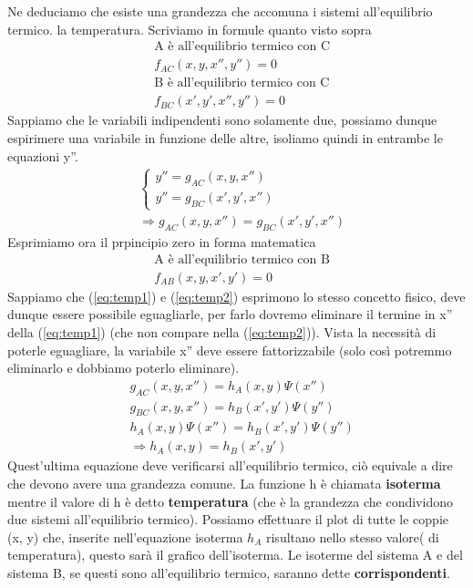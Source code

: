 \documentclass[10pt,a4paper]{article}
\begin{document}
Ne deduciamo che esiste una grandezza che accomuna i sistemi all'equilibrio termico. la temperatura. Scriviamo in formule quanto visto sopra
\begin{align*} 
&\text{A è all'equilibrio termico con C}\\
&f_{AC}(x, y, x'', y'') = 0\\
&\text{B è all'equilibrio termico con C}\\
&f_{BC}(x', y', x'', y'') = 0
\end{align*} 
Sappiamo che le variabili indipendenti sono solamente due, possiamo dunque espirimere una variabile in funzione delle altre, isoliamo quindi in entrambe le equazioni y''. 
\begin{align}\label{eq:temp1}
&\begin{cases}
	y'' = g_{AC}(x, y, x'')\\
	y'' = g_{BC}(x', y', x'')
\end{cases}\\\nonumber
&\Rightarrow g_{AC}(x, y, x'')=  g_{BC}(x', y', x'')
\end{align} 
Esprimiamo ora il prpincipio zero in forma matematica
\begin{align}\label{eq:temp2}
&\text{A è all'equilibrio termico con B}\\ \nonumber
&f_{AB}(x,y, x', y') = 0
\end{align} 
Sappiamo che (\ref{eq:temp1}) e (\ref{eq:temp2}) esprimono lo stesso concetto fisico, deve dunque essere possibile eguagliarle, per farlo dovremo eliminare il termine in x'' della (\ref{eq:temp1}) (che non compare nella (\ref{eq:temp2})). Vista la necessità di poterle eguagliare, la variabile x''  deve essere fattorizzabile (solo così potremmo eliminarlo e dobbiamo poterlo eliminare).
\begin{align*} 
	&g_{AC}(x, y, x'')=h_A(x, y) \Psi(x'') \\
	&g_{BC}(x, y, x'')=h_B(x', y') \Psi(y'')\\
	&h_A(x, y) \Psi(x'')=h_B(x', y') \Psi(y'')\\
	&\Rightarrow h_A(x, y) = h_B(x', y')
\end{align*} 
Quest'ultima equazione deve verificarsi all'equilibrio termico, ciò equivale a dire che devono avere una grandezza comune. La funzione h è chiamata \textbf{isoterma} mentre il valore di h è detto \textbf{temperatura} (che è la grandezza che condividono due sistemi all'equilibrio termico). Possiamo effettuare il plot di tutte le coppie (x, y) che, inserite nell'equazione isoterma $h_A$ risultano nello stesso valore( di temperatura), questo sarà il grafico dell'isoterma. Le isoterme del sistema A e del sistema B, se questi sono all'equilibrio termico, saranno dette \textbf{corrispondenti}. 
\end{document}
